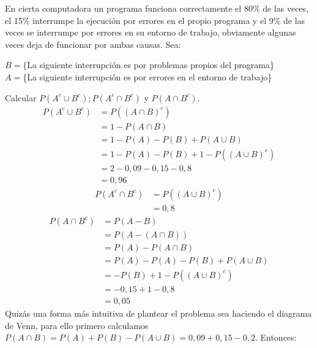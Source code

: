 \item En cierta computadora un programa funciona correctamente el 80\% de las veces, el 15\% interrumpe la ejecución por errores en el propio programa y el 9\% de las veces se interrumpe por errores en su entorno de trabajo, obviamente algunas veces deja de funcionar por ambas causas. Sea:
    \begin{center}
        $B=\{$La siguiente interrupción es por problemas propios del programa\}\\
        $A=$\{La siguiente interrupción es por errores en el entorno de trabajo\}\\
    \end{center}
    Calcular $P(A^c\cup B^c);P(A^c\cap B^c)$ y $P(A\cap B^c)$.
    \begin{align*}
        P(A^c\cup B^c)&=P((A\cap B)^c)\\
        &=1-P(A\cap B)\\
        &=1-P(A)-P(B)+P(A\cup B)\\
        &=1-P(A)-P(B)+1-P((A\cup B)^c)\\
        &=2-0,09-0,15-0,8\\
        &=0,96
    \end{align*}
    \begin{align*}
        P(A^c\cap B^c)&=P((A\cup B)^c)\\
        &=0,8
    \end{align*}
    \begin{align*}
        P(A\cap B^c)&=P(A-B)\\
        &=P(A-(A\cap B))\\
        &=P(A)-P(A\cap B)\\
        &=P(A)-P(A)-P(B)+P(A\cup B)\\
        &=-P(B)+1-P((A\cup B)^c)\\
        &=-0,15+1-0,8\\
        &=0,05
    \end{align*}
    Quizás una forma más intuitiva de plantear el problema sea haciendo el diagrama de Venn, para ello primero calculamos $P(A\cap B)=P(A)+P(B)-P(A\cup B)=0,09+0,15-0,2$. Entonces:
    \begin{center}
    \end{center}
